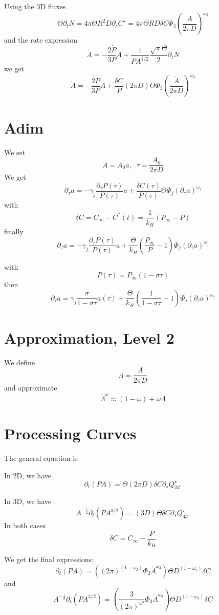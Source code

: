 \documentclass[11pt]{revtex4}
\begin{document}
Using the 3D fluxes
$$
	\Theta \partial_t N = 4\pi \Theta R^2 D \partial_r C^\star = 4\pi \Theta R D \delta C  \Phi_3 \left(\dfrac{\dot{A}}{2\pi D}\right)^ {\omega_3}
$$
and the rate expression
$$
\dot{A}  =  -\dfrac{2\dot{P}}{3P} A + \dfrac{1}{PA^{1/2}} \dfrac{\sqrt{\pi}\Theta}{2} \partial_t N
$$
we get
\begin{equation}
	\dot{A}  =  -\dfrac{2\dot{P}}{3P} A + \dfrac{\delta C}{P} (2\pi D) \Theta \Phi_3 \left(\dfrac{\dot{A}}{2\pi D}\right)^ {\omega_3}
\end{equation}


\section{Adim}
We set
$$
	A = A_0 a, \;\; \tau = \dfrac{A_0}{2\pi D}
$$
We get
$$
	\partial_\tau a = - \gamma_j \dfrac{\partial_\tau{P}(\tau)}{P(\tau)} a + \dfrac{\delta C(\tau)}{P(\tau)} \Theta \Phi_j \left( \partial_\tau a \right)^{\omega_j}
$$
with
$$
	\delta C = C_\infty - C^*(t) = \dfrac{1}{k_H}\left( P_\infty - P\right)
$$
finally
$$
	\partial_\tau a = - \gamma_j \dfrac{\partial_\tau{P}(\tau)}{P(\tau)} a + \dfrac{\Theta}{k_H} \left( \dfrac{P_\infty}{P} -1 \right) \Phi_j \left( \partial_\tau a \right)^{\omega_j}
$$

with 
$$P(\tau) = P_\infty\left( 1 - \sigma\tau\right)$$
then
$$
	\partial_\tau a = \gamma_j \dfrac{\sigma}{1-\sigma\tau} a(\tau)
	+ \dfrac{\Theta}{k_H} \left( \dfrac{1}{1-\sigma\tau} - 1 \right) \Phi_j \left( \partial_\tau a \right)^{\omega_j}
$$

\section{Approximation, Level 2}
We define
$$
	\Lambda = \frac{A}{2\pi D}
$$
and approximate
$$
	\dot\Lambda^\omega \approx (1-\omega) + \omega \dot\Lambda
$$


\section{Processing Curves}
The general equation is

In 2D, we have
$$
	\partial_t (PA) = \Theta (2\pi D) \delta C \partial_s Q^\star_{2d}.
$$

In 3D, we have
$$
	 A^{-\frac{1}{2}}\partial_t (PA^{3/2}) = (3D) \Theta  \delta C \partial_s Q^\star_{3d}.
$$
In both cases
$$
	\delta C = C_\infty-\dfrac{P}{k_H}
$$

We get the final expressions:
$$
	\partial_t(PA) = \left((2\pi)^{(1-\omega_2)}\Phi_2 {\dot{A}}^{\omega_2}\right) \Theta D^{(1-\omega_2)} \delta C 
$$
and
$$
	 A^{-\frac{1}{2}}\partial_t (PA^{3/2}) = \left(\dfrac{3}{(2\pi)^{\omega^3}}\Phi_3 {\dot{A}}^{\omega_3}\right) \Theta D^{(1-\omega_3)} \delta C
$$
\end{document}
